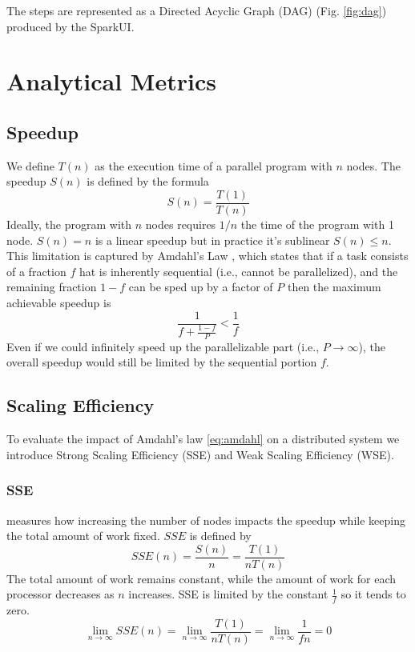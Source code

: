 \documentclass[conference]{IEEEtran}
\begin{document}
The steps are represented as a Directed Acyclic Graph (DAG) (Fig. \ref{fig:dag}) produced by the SparkUI.

\section{Analytical Metrics}

\subsection{Speedup}
We define $T(n)$ as the execution time of a parallel program with $n$ nodes. The speedup $S(n)$ is defined by the formula
\begin{equation}
S(n)= \frac{T(1)}{T(n)} 
\end{equation}
Ideally, the program with $n$ nodes requires $1/n$ the time of the program with 1 node. $S(n) = n$ is a linear speedup but in practice it's sublinear $S(n) \leq n$. This limitation is captured by Amdahl's Law \cite{10.1145/1465482.1465560}, which states that if a task consists of a fraction $f$ hat is inherently sequential (i.e., cannot be parallelized), and the remaining fraction $1-f$ can be sped up by a factor of $P$ then the maximum achievable speedup is
\begin{equation}
\frac{1}{f + \frac{1-f}{P}}\label{eq:amdahl} < \frac{1}{f}
\end{equation}
Even if we could infinitely speed up the parallelizable part (i.e., $P \rightarrow \infty$), the overall speedup would still be limited by the sequential portion $f$.

\subsection{Scaling Efficiency}
To evaluate the impact of Amdahl's law \eqref{eq:amdahl} on a distributed system we introduce Strong Scaling Efficiency (SSE) and Weak Scaling Efficiency (WSE).

\subsubsection{SSE} measures how increasing the number of nodes impacts the speedup while keeping the total amount of work fixed. $SSE$ is defined by
\begin{equation}
    SSE(n) = \frac{S(n)}{n} = \frac{T(1)}{n T(n)}
\end{equation}
The total amount of work remains constant, while the amount of work for each processor decreases as $n$ increases. SSE is limited by the constant $\frac{1}{f}$ so it tends to zero.
\begin{equation}
    \lim_{n\to\infty} SSE(n) = \lim_{n\to\infty} \frac{T(1)}{n T(n)} = \lim_{n\to\infty} \frac{1}{fn} = 0
\end{equation}
\end{document}
